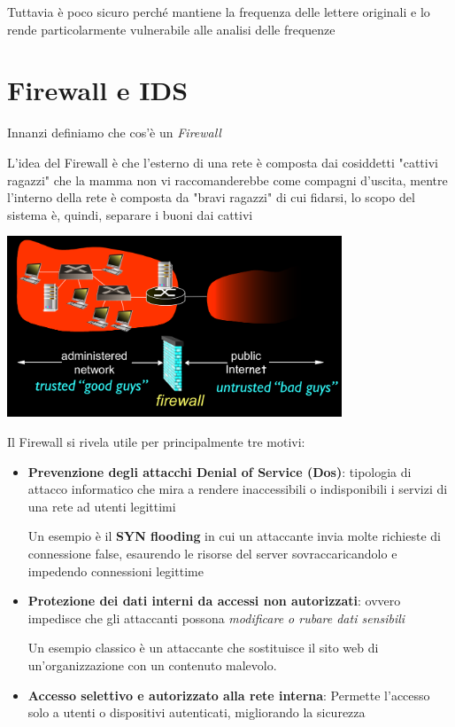 Tuttavia è poco sicuro perché mantiene la frequenza delle lettere originali e lo rende particolarmente vulnerabile alle analisi delle frequenze


\section{Firewall e IDS}

Innanzi definiamo che cos'è un \textit{Firewall}


L'idea del Firewall è che l'esterno di una rete è composta dai cosiddetti "cattivi ragazzi" che la mamma non vi raccomanderebbe come compagni d'uscita, mentre l'interno della rete è composta da "bravi ragazzi" di cui fidarsi, lo scopo del sistema è, quindi, separare i buoni dai cattivi

\begin{center}
    \includegraphics[width=10cm]{img/buoni_cattivi_e_firewall.png}
\end{center}

Il Firewall si rivela utile per principalmente tre motivi:
\begin{itemize}
    \item \textbf{Prevenzione degli attacchi Denial of Service (Dos)}: tipologia di attacco informatico che mira a rendere inaccessibili o indisponibili i servizi di una rete ad utenti legittimi
    
    Un esempio è il \textbf{SYN flooding} in cui un attaccante invia molte richieste di connessione false, esaurendo le risorse del server sovraccaricandolo e impedendo connessioni legittime

    \item \textbf{Protezione dei dati interni da accessi non autorizzati}: ovvero impedisce che gli attaccanti possona \textit{modificare o rubare dati sensibili}
    
    Un esempio classico è un attaccante che sostituisce il sito web di un'organizzazione con un contenuto malevolo.

    \item \textbf{Accesso selettivo e autorizzato alla rete interna}: Permette l’accesso solo a utenti o dispositivi autenticati, migliorando la sicurezza
\end{itemize}

